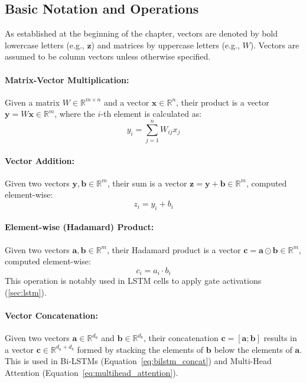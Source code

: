 \begin{appendices}
  \subsection{Basic Notation and Operations}

  As established at the beginning of the chapter, vectors are denoted by bold lowercase letters (e.g., \( \bm{z} \)) and matrices by uppercase letters (e.g., \( W \)). Vectors are assumed to be column vectors unless otherwise specified.

  \paragraph{Matrix-Vector Multiplication:}
  Given a matrix \( W \in \mathbb{R}^{m \times n} \) and a vector \( \bm{x} \in \mathbb{R}^n \), their product is a vector \( \bm{y} = W\bm{x} \in \mathbb{R}^m \), where the \( i \)-th element is calculated as:
  \begin{equation}
    y_i = \sum_{j=1}^{n} W_{ij} x_j
  \end{equation}

  \paragraph{Vector Addition:}
  Given two vectors \( \bm{y}, \bm{b} \in \mathbb{R}^m \), their sum is a vector \( \bm{z} = \bm{y} + \bm{b} \in \mathbb{R}^m \), computed element-wise:
  \begin{equation}
    z_i = y_i + b_i
  \end{equation}

  \paragraph{Element-wise (Hadamard) Product:}
  Given two vectors \( \bm{a}, \bm{b} \in \mathbb{R}^m \), their Hadamard product is a vector \( \bm{c} = \bm{a} \odot \bm{b} \in \mathbb{R}^m \), computed element-wise:
  \begin{equation}
    c_i = a_i \cdot b_i
  \end{equation}
  This operation is notably used in LSTM cells to apply gate activations (\autoref{sec:lstm}).

  \paragraph{Vector Concatenation:}
  Given two vectors \( \bm{a} \in \mathbb{R}^{d_a} \) and \( \bm{b} \in \mathbb{R}^{d_b} \), their concatenation \( \bm{c} = [\bm{a} ; \bm{b}] \) results in a vector \( \bm{c} \in \mathbb{R}^{d_a + d_b} \) formed by stacking the elements of \( \bm{b} \) below the elements of \( \bm{a} \). This is used in Bi-LSTMs (Equation~\ref{eq:bilstm_concat}) and Multi-Head Attention (Equation~\ref{eq:multihead_attention}).


\end{appendices}
